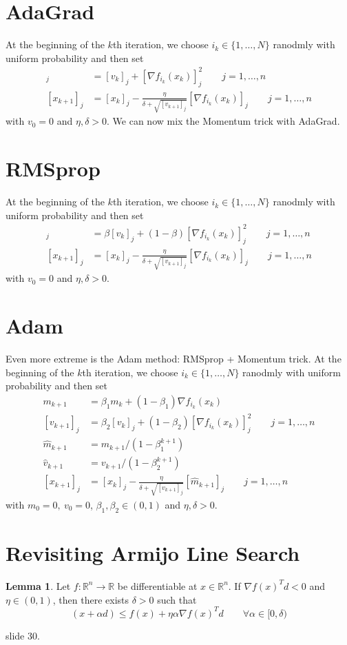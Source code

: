 \documentclass[12pt, openany]{report}
\newcommand{\R}{\mathbb{R}}
\theoremstyle{definition}
\newtheorem{lem}[thm]{Lemma}
\begin{document}
\section{AdaGrad}
At the beginning of the $k$th iteration, we choose $i_k\in \{1,\dots,N\}$ ranodmly with uniform probability and then set 
\begin{align}
    [v_{k+1}]_j &= [v_k]_j + [\nabla f_{i_k}(x_k)]_j^2 \qquad j = 1,\dots, n\nonumber \\
    [x_{k+1}]_j &= [x_k]_j - \frac{\eta}{\delta + \sqrt{[v_{k+1}]_j}}[\nabla f_{i_k}(x_k)]_j\qquad j=1,\dots, n
\end{align}
with $v_0=0$ and $\eta, \delta >0$.
We can now mix the Momentum trick with AdaGrad.
\section{RMSprop}
At the beginning of the $k$th iteration, we choose $i_k\in \{1,\dots,N\}$ ranodmly with uniform probability and then set 
\begin{align}
    [v_{k+1}]_j &= \beta[v_k]_j + (1-\beta)[\nabla f_{i_k}(x_k)]_j^2 \qquad j = 1,\dots, n\nonumber \\
    [x_{k+1}]_j &= [x_k]_j - \frac{\eta}{\delta + \sqrt{[v_{k+1}]_j}}[\nabla f_{i_k}(x_k)]_j\qquad j=1,\dots, n
\end{align}
with $v_0=0$ and $\eta, \delta >0$.
\section{Adam}
Even more extreme is the Adam method: RMSprop + Momentum trick.
At the beginning of the $k$th iteration, we choose $i_k\in \{1,\dots,N\}$ ranodmly with uniform probability and then set 
\begin{align}
    m_{k+1} &= \beta_1m_k + (1-\beta_1)\nabla f_{i_k}(x_k)\nonumber \\
    [v_{k+1}]_j &= \beta_2[v_k]_j + (1-\beta_2)[\nabla f_{i_k}(x_k)]_j^2 \qquad j = 1,\dots, n\nonumber \\
    \hat m_{k+1} &= m_{k+1}/\left(1-\beta_1^{k+1}\right)\\
    \hat v_{k+1} &= v_{k+1}/\left(1-\beta_2^{k+1}\right)\nonumber \\
    [x_{k+1}]_j &= [x_k]_j - \frac{\eta}{\delta + \sqrt{[v_{k+1}]_j}}[\hat m_{k+1}]_j\qquad j=1,\dots, n\nonumber 
\end{align}
with $m_0=0, \: v_0=0$, $\beta_1,\beta_2\in (0,1)$ and $\eta, \delta >0$.
\section{Revisiting Armijo Line Search}
\begin{lem}
    Let $f: \R^n\rightarrow \R$ be differentiable at $x\in \R^n$. If $\nabla f(x)^Td<0$ and $\eta\in (0,1)$, then there exists $\delta >0$ such that 
    \begin{equation}
        (x+\alpha d)\le f(x)+\eta \alpha \nabla f(x)^Td\qquad \forall \alpha \in [0,\delta)
    \end{equation}
\end{lem}
slide 30.
\end{document}
